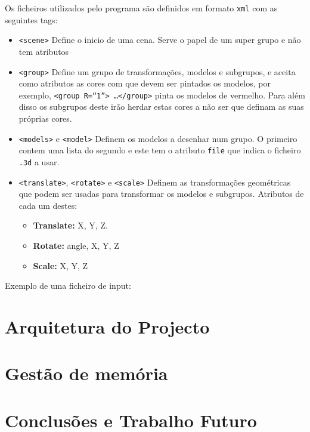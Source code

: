 \documentclass[a4paper]{article}
\begin{document}
Os ficheiros utilizados pelo programa são definidos em formato \texttt{xml} com as seguintes tags:
\begin{itemize}
    \item \texttt{<scene>} Define o inicio de uma cena. Serve o papel de um
        super grupo e não tem atributos
    \item \texttt{<group>} Define um grupo de transformações, modelos e
        subgrupos, e aceita como atributos as cores com que devem ser pintados
        os modelos, por exemplo,
        \texttt{<group R=``1''> \ldots </group>} pinta os modelos de vermelho.
        Para além disso os subgrupos deste irão herdar estas cores a não ser
        que definam as suas próprias cores.
    \item \texttt{<models>} e \texttt{<model>} Definem os modelos a desenhar
        num grupo. O primeiro contem uma lista do segundo e este tem o atributo
        \texttt{file} que indica o ficheiro \texttt{.3d} a usar.
    \item \texttt{<translate>}, \texttt{<rotate>} e \texttt{<scale>} Definem as
        transformações geométricas que podem ser usadas para transformar os
        modelos e subgrupos. Atributos de cada um destes:
        \begin{itemize}
            \item \textbf{Translate:} X, Y, Z.
            \item \textbf{Rotate:} angle, X, Y, Z
            \item \textbf{Scale:} X, Y, Z
        \end{itemize}
\end{itemize}

Exemplo de uma ficheiro de input:


\section{Arquitetura do Projecto}

\section{Gestão de memória}

\section{Conclusões e Trabalho Futuro}
\end{document}

